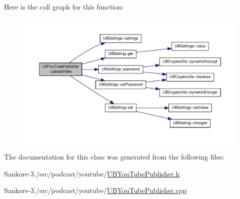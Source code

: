 Here is the call graph for this function\-:
\nopagebreak
\begin{figure}[H]
\begin{center}
\leavevmode
\includegraphics[width=350pt]{df/d84/class_u_b_you_tube_publisher_a56dcb4025c544233b4674c2db85da252_cgraph}
\end{center}
\end{figure}




The documentation for this class was generated from the following files\-:\begin{DoxyCompactItemize}
\item 
Sankore-\/3./src/podcast/youtube/\hyperlink{_u_b_you_tube_publisher_8h}{U\-B\-You\-Tube\-Publisher.\-h}\item 
Sankore-\/3./src/podcast/youtube/\hyperlink{_u_b_you_tube_publisher_8cpp}{U\-B\-You\-Tube\-Publisher.\-cpp}\end{DoxyCompactItemize}

